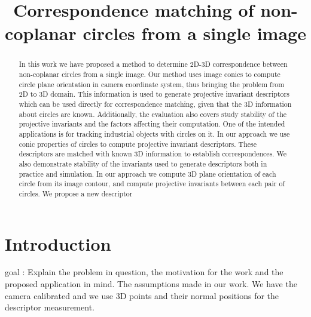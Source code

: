 \documentclass{bmvc2k}
\title{Correspondence matching of non-coplanar circles from a single image}
\begin{document}
\maketitle

\begin{abstract}
In this work we have proposed a method to determine 2D-3D correspondence between non-coplanar circles from a single image.
Our method uses image conics to compute circle plane orientation in camera coordinate system, thus bringing the problem from 2D to 3D domain. This information is used to generate projective invariant descriptors which can be used directly for correspondence matching, given that the 3D information about circles are known. Additionally, the evaluation also covers study stability of the projective invariants and the factors affecting their computation. One of the intended applications is for tracking industrial objects with circles on it. In our approach we use conic properties of circles to compute projective invariant descriptors. These descriptors are matched with known 3D information to establish correspondences. We also demonstrate stability of the invariants used to generate descriptors both in practice and simulation. 
In our approach we compute 3D plane orientation of each circle from its image contour, and compute projective invariants between each pair of circles. We propose a new descriptor 

\end{abstract}

\section{Introduction}
\label{sec:intro}
goal : 
Explain the problem in question, the motivation for the work and the proposed application in mind. The assumptions made in our work. We have the camera calibrated and we use 3D points and their normal positions for the descriptor measurement. 
\end{document}
